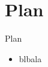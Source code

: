 \section{Plan}

\begin{frame}{Plan}
    \begin{itemize}
        \item blbala
    \end{itemize}
\end{frame}
